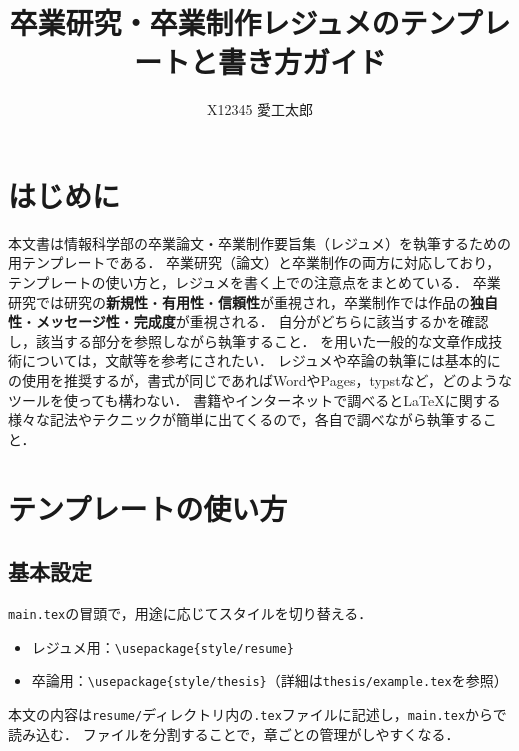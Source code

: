 
\title{卒業研究・卒業制作レジュメのテンプレートと書き方ガイド} %
\subtitle{} %

\author{%
    X12345 愛工太郎%
}



\maketitle

\section{はじめに}
\label{sec:intro}
本文書は情報科学部の卒業論文・卒業制作要旨集（レジュメ）を執筆するための\upLaTeX 用テンプレートである．
卒業研究（論文）と卒業制作の両方に対応しており，テンプレートの使い方と，レジュメを書く上での注意点をまとめている．
卒業研究では研究の\textbf{新規性}・\textbf{有用性}・\textbf{信頼性}が重視され，卒業制作では作品の\textbf{独自性}・\textbf{メッセージ性}・\textbf{完成度}が重視される．
自分がどちらに該当するかを確認し，該当する部分を参照しながら執筆すること．
\upLaTeX を用いた一般的な文章作成技術については，文献\cite{tex}等を参考にされたい．
レジュメや卒論の執筆には基本的に\upLaTeX の使用を推奨するが，書式が同じであればWordやPages，typstなど，どのようなツールを使っても構わない．
書籍やインターネットで調べると\LaTeX に関する様々な記法やテクニックが簡単に出てくるので，各自で調べながら執筆すること．

\section{テンプレートの使い方}
\label{sec:usage}

\subsection{基本設定}
\label{subsec:basic}
\texttt{main.tex}の冒頭で，用途に応じてスタイルを切り替える．
\begin{itemize}
    \item レジュメ用：\verb|\usepackage{style/resume}|
    \item 卒論用：\verb|\usepackage{style/thesis}|（詳細は\texttt{thesis/example.tex}を参照）
\end{itemize}
本文の内容は\texttt{resume/}ディレクトリ内の\texttt{.tex}ファイルに記述し，\texttt{main.tex}から\verb||で読み込む．
ファイルを分割することで，章ごとの管理がしやすくなる．

